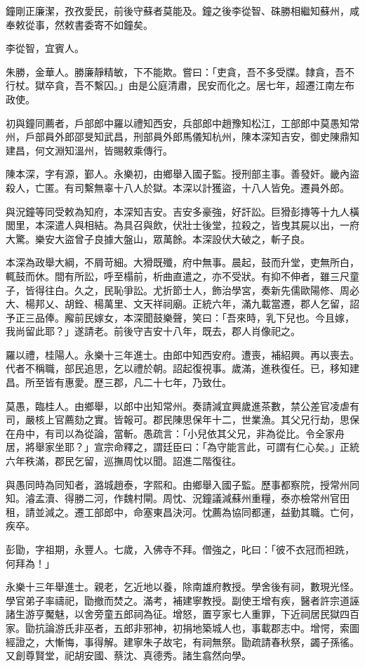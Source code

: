\begin{pinyinscope}
鐘剛正廉潔，孜孜愛民，前後守蘇者莫能及。鐘之後李從智、硃勝相繼知蘇州，咸奉敕從事，然敕書委寄不如鐘矣。

李從智，宜賓人。

朱勝，金華人。勝廉靜精敏，下不能欺。嘗曰：「吏貪，吾不多受牒。隸貪，吾不行杖。獄卒貪，吾不繫囚。」由是公庭清肅，民安而化之。居七年，超遷江南左布政使。

初與鐘同薦者，戶部郎中羅以禮知西安，兵部郎中趙豫知松江，工部郎中莫愚知常州，戶部員外郎邵旻知武昌，刑部員外郎馬儀知杭州，陳本深知吉安，御史陳鼎知建昌，何文淵知溫州，皆賜敕乘傳行。

陳本深，字有源，鄞人。永樂初，由鄉舉入國子監。授刑部主事。善發奸。畿內盜殺人，亡匿。有司繫無辜十八人於獄。本深以計獲盜，十八人皆免。遷員外郎。

與況鐘等同受敕為知府，本深知吉安。吉安多豪強，好訐訟。巨猾彭摶等十九人橫閭里，本深遣人與相結。為具召與飲，伏壯士後堂，拉殺之，皆曳其屍以出，一府大驚。樂安大盜曾子良據大盤山，眾萬餘。本深設伏大破之，斬子良。

本深為政舉大綱，不屑苛細。大猾既殲，府中無事。晨起，鼓而升堂，吏無所白，輒鼓而休。間有所訟，呼至榻前，析曲直遣之，亦不受狀。有抑不伸者，雖三尺童子，皆得往白。久之，民恥爭訟。尤折節士人，飾治學宮，奏新先儒歐陽修、周必大、楊邦乂、胡銓、楊萬里、文天祥祠廟。正統六年，滿九載當遷，郡人乞留，詔予正三品俸。廨前民嫁女，本深聞鼓樂聲，笑曰：「吾來時，乳下兒也。今且嫁，我尚留此耶？」遂請老。前後守吉安十八年，既去，郡人肖像祀之。

羅以禮，桂陽人。永樂十三年進士。由郎中知西安府。遭喪，補紹興。再以喪去。代者不稱職，部民追思，乞以禮於朝。詔起復視事。歲滿，進秩復任。已，移知建昌。所至皆有惠愛。歷三郡，凡二十七年，乃致仕。

莫愚，臨桂人。由鄉舉，以郎中出知常州。奏請減宜興歲進茶數，禁公差官凌虐有司，嚴核上官薦劾之實。皆報可。郡民陳思保年十二，世業漁。其父兄行劫，思保在舟中，有司以為從論，當斬。愚疏言：「小兒依其父兄，非為從比。令全家舟居，將舉家坐耶？」宣宗命釋之，謂廷臣曰：「為守能言此，可謂有仁心矣。」正統六年秩滿，郡民乞留，巡撫周忱以聞。詔進二階復往。

與愚同時為同知者，潞城趙泰，字熙和。由鄉舉入國子監。歷事都察院，授常州同知。濬孟瀆、得勝二河，作魏村閘。周忱、況鐘議減蘇州重糧，泰亦檢常州官田租，請並減之。遷工部郎中，命塞東昌決河。忱薦為協同都運，益勤其職。亡何，疾卒。

彭勖，字祖期，永豐人。七歲，入佛寺不拜。僧強之，叱曰：「彼不衣冠而袒跣，何拜為！」

永樂十三年舉進士。親老，乞近地以養，除南雄府教授。學舍後有祠，數現光怪。學官弟子率禱祀，勖撤而焚之。滿考，補建寧教授。副使王增有疾，醫者許宗道誣諸生游亨魘魅，以舍旁童五郎祠為征。增怒，置亨家七人重罪，下近祠居民獄四百家。勖抗論游氏非巫者，五郎非邪神，初捐地築城人也，事載郡志中。增愕，索圖經證之，大慚悔，事得解。建寧朱子故宅，有祠無祭。勖疏請春秋祭，蠲子孫徭。又創尊賢堂，祀胡安國、蔡沈、真德秀。諸生翕然向學。


\end{pinyinscope}
